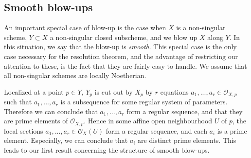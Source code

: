 \documentclass[12pt,a4paper,leqno]{article}
\newcommand{\OO}{\mathcal{O}}
\theoremstyle{plain}
\theoremstyle{definition}
\theoremstyle{remark}
\begin{document}
\subsection{Smooth blow-ups}

An important special case of blow-up is the case when $X$ is a non-singular scheme, $Y \subset X$ a non-singular closed subscheme, and we blow up $X$ along $Y$. In this situation, we say that the blow-up is \emph{smooth}. This special case is the only case necessary for the resolution theorem, and the advantage of restricting our attention to these, is the fact that they are fairly easy to handle. We assume that all non-singular schemes are locally Noetherian.

Localized at a point $p \in Y$, $Y_p$ is cut out by $X_p$ by $r$ equations $a_1,...,a_r \in \OO_{X,p}$ such that $a_1,...,a_r$ is a subsequence for some regular system of parameters. Therefore we can conclude that $a_1, ..., a_r$ form a regular sequence, and that they are prime elements of $\OO_{X,p}$. Hence in some affine open neighbourhood $U$ of $p$, the local sections $a_1,...,a_r \in \OO_X(U)$ form a regular sequence, and each $a_i$ is a prime element. Especially, we can conclude that $a_i$ are distinct prime elements. This leads to our first result concerning the structure of smooth blow-ups.
\end{document}
